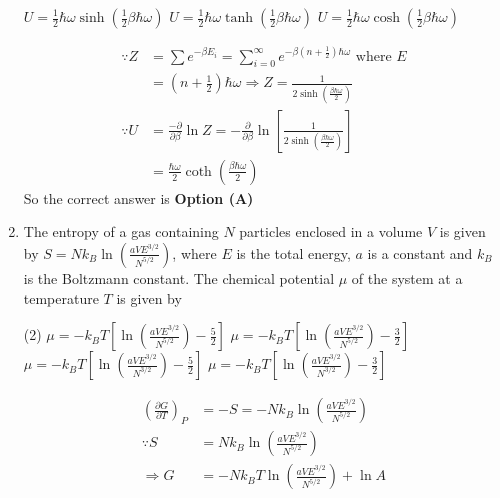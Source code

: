 \begin{enumerate}
\begin{tasks}
		\task[\textbf{B.}] $U=\frac{1}{2} \hbar \omega \sinh \left(\frac{1}{2} \beta \hbar \omega\right)$
		\task[\textbf{C.}] $U=\frac{1}{2} \hbar \omega \tanh \left(\frac{1}{2} \beta \hbar \omega\right)$
		\task[\textbf{D.}] $U=\frac{1}{2} \hbar \omega \cosh \left(\frac{1}{2} \beta \hbar \omega\right)$
	\end{tasks}
	\begin{answer}
		\begin{align*}
		\because Z&=\sum e^{-\beta E_{i}}=\sum_{i=0}^{\infty} e^{-\beta\left(n+\frac{1}{2}\right) \hbar \omega}\text{ where }E\\&=\left(n+\frac{1}{2}\right) \hbar \omega \Rightarrow Z=\frac{1}{2 \sinh \left(\frac{\beta \hbar \omega}{2}\right)}\\
		\because U&=\frac{-\partial}{\partial \beta} \ln Z=-\frac{\partial}{\partial \beta} \ln \left[\frac{1}{2 \sinh \left(\frac{\beta \hbar \omega}{2}\right)}\right]\\&=\frac{\hbar \omega}{2} \operatorname{coth}\left(\frac{\beta \hbar \omega}{2}\right)
		\end{align*}
		So the correct answer is \textbf{Option (A)}
	\end{answer}	
	\item  The entropy of a gas containing $N$ particles enclosed in a volume $V$ is given by $S=N k_{B} \ln \left(\frac{a V E^{3 / 2}}{N^{5 / 2}}\right)$, where $E$ is the total energy, $a$ is a constant and $k_{B}$ is the Boltzmann constant. The chemical potential $\mu$ of the system at a temperature $T$ is given by
	{}
	\begin{tasks}(2)
		\task[\textbf{A.}] $\mu=-k_{B} T\left[\ln \left(\frac{a V E^{3 / 2}}{N^{5 / 2}}\right)-\frac{5}{2}\right]$
		\task[\textbf{B.}] $\mu=-k_{B} T\left[\ln \left(\frac{a V E^{3 / 2}}{N^{5 / 2}}\right)-\frac{3}{2}\right]$
		\task[\textbf{C.}] $\mu=-k_{B} T\left[\ln \left(\frac{a V E^{3 / 2}}{N^{3 / 2}}\right)-\frac{5}{2}\right]$
		\task[\textbf{D.}] $\mu=-k_{B} T\left[\ln \left(\frac{a V E^{3 / 2}}{N^{3 / 2}}\right)-\frac{3}{2}\right]$
	\end{tasks}
	\begin{answer}
		\begin{align*}
		\left(\frac{\partial G}{\partial T}\right)_{P}&=-S=-N k_{B} \ln \left(\frac{a V E^{3 / 2}}{N^{5 / 2}}\right)\\ \because S&=N k_{B} \ln \left(\frac{a V E^{3 / 2}}{N^{5 / 2}}\right)\\
		\Rightarrow G&=-N k_{B} T \ln \left(\frac{a V E^{3 / 2}}{N^{5 / 2}}\right)+\ln A\\

\end{align*}
\end{answer}
\end{enumerate}
